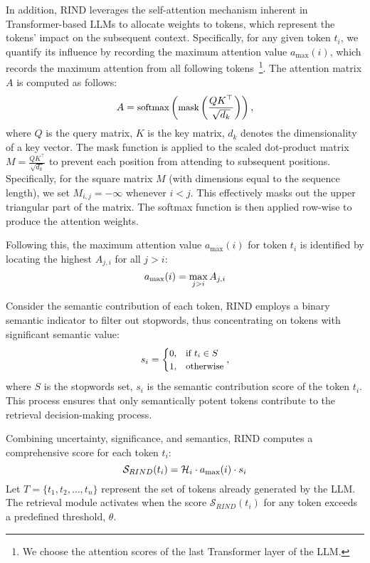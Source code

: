 In addition, RIND leverages the self-attention mechanism inherent in Transformer-based LLMs to allocate weights to tokens, which represent the tokens' impact on the subsequent context.
Specifically, for any given token \(t_i\), we quantify its influence by recording the maximum attention value \(a_{\max}(i)\), which records the maximum attention from all following tokens~\footnote{We choose the attention scores of the last Transformer layer of the LLM.}.  
The attention matrix \(A\) is computed as follows:
\begin{equation}
\small
A = \text{softmax}\left(\text{mask}\left(\frac{QK^\top}{\sqrt{d_k}}\right)\right),
\end{equation}
where \(Q\) is the query matrix, \(K\) is the key matrix, \(d_k\) denotes the dimensionality of a key vector. 
The mask function is applied to the scaled dot-product matrix \( M = \frac{QK^\top}{\sqrt{d_k}} \) to prevent each position from attending to subsequent positions. Specifically, for the square matrix \( M \) (with dimensions equal to the sequence length), we set \( M_{i,j} = -\infty \) whenever \( i < j \). This effectively masks out the upper triangular part of the matrix. The softmax function is then applied row-wise to produce the attention weights.

Following this, the maximum attention value \(a_{\max}(i)\) for token \(t_i\) is identified by locating the highest \(A_{j,i}\) for all \(j > i\):
\begin{equation}
\small
a_{\max}(i) = \max_{j > i} A_{j,i}
\end{equation}

Consider the semantic contribution of each token, RIND employs a binary semantic indicator to filter out stopwords, thus concentrating on tokens with significant semantic value:
\begin{equation}
\small
 s_i = \begin{cases} 0, & \text{if } t_i \in S \\ 1, & \text{otherwise} \end{cases} ,
\end{equation}
where $S$ is the stopwords set, $s_i$ is the semantic contribution score of the token $t_i$. This process ensures that only semantically potent tokens contribute to the retrieval decision-making process.

Combining uncertainty, significance, and semantics, RIND computes a comprehensive score for each token $t_i$:
\begin{equation}
\small
\mathcal{S}_{RIND}(t_i) = \mathcal{H}_i \cdot a_{\max}(i) \cdot s_i
\end{equation}
Let $T = \{t_1, t_2, \ldots, t_n\}$ represent the set of tokens already generated by the LLM. The retrieval module activates when the score $\mathcal{S}_{RIND}(t_i)$ for any token exceeds a predefined threshold, \(\theta\).

